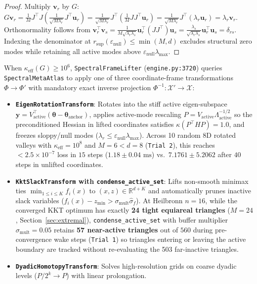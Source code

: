 \documentclass[11pt,a4paper]{article}
\begin{document}
\begin{proof}
Multiply $\mathbf{v}_r$ by $G$: $G \mathbf{v}_r = \frac{1}{M} J^\top J \left(\frac{1}{\sqrt{M\lambda_r}} J^\top \mathbf{u}_r\right) = \frac{1}{\sqrt{M\lambda_r}} J^\top \left(\frac{1}{M} J J^\top \mathbf{u}_r\right) = \frac{1}{\sqrt{M\lambda_r}} J^\top (\lambda_r \mathbf{u}_r) = \lambda_r \mathbf{v}_r$. Orthonormality follows from $\mathbf{v}_r^\top \mathbf{v}_s = \frac{1}{M\sqrt{\lambda_r \lambda_s}} \mathbf{u}_r^\top (J J^\top) \mathbf{u}_s = \frac{\lambda_s}{\sqrt{\lambda_r \lambda_s}} \mathbf{u}_r^\top \mathbf{u}_s = \delta_{rs}$. Indexing the denominator at $r_{\sup}(\varepsilon_{\text{null}}) \le \min(M, d)$ excludes structural zero modes while retaining all active modes above $\varepsilon_{\text{null}}\lambda_{\max}$.
\end{proof}

When $\kappa_{\text{eff}}(G) \ge 10^6$, \texttt{SpectralFrameLifter} (\texttt{engine.py:3720}) queries \texttt{SpectralMetaAtlas} to apply one of three coordinate-frame transformations $\Phi \to \Phi'$ with mandatory exact inverse projection $\Phi^{-1}: \mathcal{X}' \to \mathcal{X}$:
\begin{itemize}
\item \textbf{\texttt{EigenRotationTransform}}: Rotates into the stiff active eigen-subspace $\mathbf{y} = V_{\text{active}}^\top(\boldsymbol{\theta} - \boldsymbol{\theta}_{\text{anchor}})$, applies active-mode rescaling $P = V_{\text{active}}\Lambda_{\text{active}}^{-1/2}$ so the preconditioned Hessian in lifted coordinates satisfies $\kappa(P^\top H P) = 1.0$, and freezes sloppy/null modes ($\lambda_r \le \varepsilon_{\text{null}}\lambda_{\max}$). Across 10 random 8D rotated valleys with $\kappa_{\text{eff}} = 10^8$ and $M=6 < d=8$ (\texttt{Trial 2}), this reaches $< 2.5\times 10^{-7}$ loss in $15$ steps ($1.18 \pm 0.04\text{ ms}$) vs.\ $7.1761 \pm 5.2062$ after $40$ steps in unlifted coordinates.
\item \textbf{\texttt{KktSlackTransform} with \texttt{condense\_active\_set}}: Lifts non-smooth minimax ties $\min_{1 \le i \le K} f_i(x)$ to $(x, z) \in \mathbb{R}^{d+K}$ and automatically prunes inactive slack variables ($f_i(x) - z_{\min} > \sigma_{\text{mult}}\hat{\sigma}_f$). At Heilbronn $n=16$, while the converged KKT optimum has exactly \textbf{24 tight equiareal triangles} ($M=24$, Section~\ref{sec:extremal}), \texttt{condense\_active\_set} with buffer multiplier $\sigma_{\text{mult}} = 0.05$ retains \textbf{57 near-active triangles} out of $560$ during pre-convergence wake steps (\texttt{Trial 1}) so triangles entering or leaving the active boundary are tracked without re-evaluating the 503 far-inactive triangles.
\item \textbf{\texttt{DyadicHomotopyTransform}}: Solves high-resolution grids on coarse dyadic levels ($P/2^k \to P$) with linear prolongation.
\end{itemize}
\end{document}

